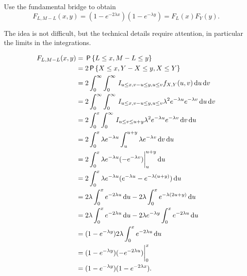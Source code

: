 \begin{exercise}\label{ex:27}
Use the fundamental bridge to obtain
\begin{equation*}
F_{L,M-L}(x,y) = (1- e^{-2\lambda x}) (1-e^{-\lambda y}) =  F_L(x) F_Y(y).
\end{equation*}
\begin{hint}
The idea is not difficult, but the technical details require attention, in particular the limits in the integrations.
\end{hint}
\begin{solution}
\begin{align*}
F_{L, M-L}(x, y)
&=\,\mathsf{P}\left\{L\leq x, M-L\leq y\right\}\\
&= 2\,\mathsf{P}\left\{X\leq x, Y-X \leq y, X \leq Y\right\} \\
&= 2\int_0^{\infty} \int_0^{\infty} \,I_{u\leq x, v-u\leq y, u \leq v} f_{X,Y}(u, v)  \,\textrm{d}u \,\textrm{d}v\\
&= 2\int_0^{\infty} \int_0^{\infty} \,I_{u\leq x, v-u\leq y, u\leq v} \lambda^2e^{-\lambda u}e^{-\lambda v}\,\textrm{d}u \,\textrm{d}v\\
&= 2\int_0^{x} \int_0^{\infty} \,I_{u\leq v\leq u+y} \lambda^2e^{-\lambda u}e^{-\lambda v}\,\textrm{d}v \,\textrm{d}u\\
&= 2\int_0^{x} \lambda e^{-\lambda u} \int_u   ^{u + y}  \lambda e^{-\lambda v}\,\textrm{d}v \,\textrm{d}u\\
&= 2\int_0^{x} \lambda e^{-\lambda u} (-e^{-\lambda v}) \biggr|_u^{u+y}\,\textrm{d}u \\
&= 2\int_0^{x} \lambda e^{-\lambda u} (e^{-\lambda u} - e^{-\lambda (u+y)})\,\textrm{d}u \\
&= 2\lambda\int_0^{x}  e^{-2 \lambda u}\,\textrm{d}u  - 2\lambda \int_{0}^{x} e^{-\lambda (2u+y)}\,\textrm{d}u \\
&= 2\lambda\int_0^{x}  e^{-2 \lambda u}\,\textrm{d}u  - 2\lambda e^{-\lambda y }\int_{0}^{x} e^{-2 \lambda u}\,\textrm{d}u \\
&= (1-e^{-\lambda y}) 2 \lambda \int_0^{x} e^{-2 \lambda u} \,\textrm{d}u\\
&= (1-e^{-\lambda y}) ( -e^{-2\lambda u}) \biggr|_0^{x} \\
&= (1-e^{-\lambda y})(1- e^{-2\lambda x}).
\end{align*}
\end{solution}
\end{exercise}


